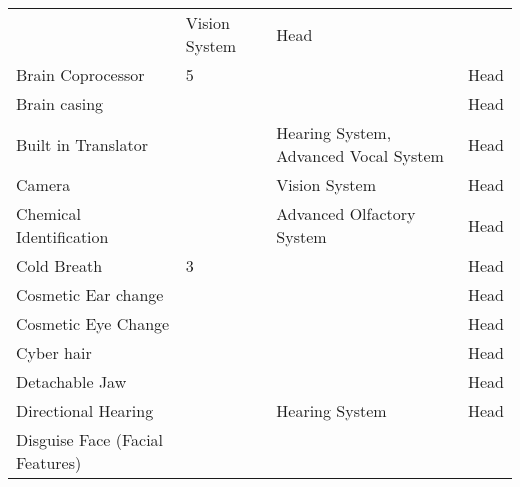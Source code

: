 \documentclass[twoside]{book}
\begin{document}
\begin{longtable}{p{1.25in}p{2em}ll}
  &
   Vision System 
  &
   Head 
  \tabularnewline
      
  \raggedright
           Brain Coprocessor 
  &
   5 
  &
  
  &
   Head 
  \tabularnewline
      
  \raggedright
           Brain casing 
  &
  
  &
  
  &
   Head 
  \tabularnewline
      
  \raggedright
           Built in Translator 
  &
  
  &
   Hearing System,
           Advanced Vocal System 
  &
   Head 
  \tabularnewline
      
  \raggedright
           Camera 
  &
  
  &
   Vision System 
  &
   Head 
  \tabularnewline
      
  \raggedright
           Chemical Identification
           
  &
  
  &
   Advanced Olfactory
           System 
  &
   Head 
  \tabularnewline
      
  \raggedright
           Cold Breath 
  &
   3 
  &
  
  &
   Head 
  \tabularnewline
      
  \raggedright
           Cosmetic Ear change 
  &
  
  &
  
  &
   Head 
  \tabularnewline
      
  \raggedright
           Cosmetic Eye Change 
  &
  
  &
  
  &
   Head 
  \tabularnewline
      
  \raggedright
           Cyber hair 
  &
  
  &
  
  &
   Head 
  \tabularnewline
      
  \raggedright
           Detachable Jaw 
  &
  
  &
  
  &
   Head 
  \tabularnewline
      
  \raggedright
           Directional Hearing 
  &
  
  &
   Hearing System 
  &
   Head 
  \tabularnewline
      
  \raggedright
           Disguise Face (Facial Features)
           
  &
  
  &
  

\end{longtable}
\end{document}
